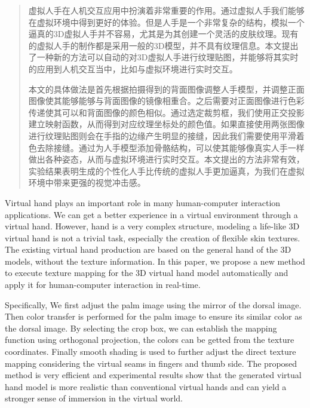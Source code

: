 \begin{abstract}
虚拟人手在人机交互应用中扮演着非常重要的作用。通过虚拟人手我们能够在虚拟环境中得到更好的体验。但是人手是一个非常复杂的结构，模拟一个逼真的3D虚拟人手并不容易，尤其是为其创建一个灵活的皮肤纹理。现有的虚拟人手的制作都是采用一般的3D模型，并不具有纹理信息。本文提出了一种新的方法可以自动的对3D虚拟人手进行纹理贴图，并能够将其实时的应用到人机交互当中，比如与虚拟环境进行实时交互。

本文的具体做法是首先根据拍摄得到的背面图像调整人手模型，并调整正面图像使其能够能够与背面图像的镜像相重合。之后需要对正面图像进行色彩传递使其可以和背面图像的颜色相似。通过选定裁剪框，我们使用正交投影建立映射函数，从而得到对应纹理坐标处的颜色值。如果直接使用两张图像进行纹理贴图则会在手指的边缘产生明显的接缝，因此我们需要使用平滑着色去除接缝。通过为人手模型添加骨骼结构，可以使其能够像真实人手一样做出各种姿态，从而与虚拟环境进行实时交互。本文提出的方法非常有效，实验结果表明生成的个性化人手比传统的虚拟人手更加逼真，为我们在虚拟环境中带来更强的视觉冲击感。

\end{abstract}

\begin{englishabstract}
Virtual hand plays an important role in many human-computer interaction
applications. We can get a better experience in a virtual environment
through a virtual hand. However, hand is a very complex structure, modeling
a life-like 3D virtual hand is not a trivial task, especially the creation
of flexible skin textures. The existing virtual hand production are based on the
general hand of the 3D models, without the texture information. In this paper, we propose a new method to execute texture mapping for the 3D
virtual hand model automatically and apply it for human-computer
interaction in real-time. 

Specifically, We first adjust the palm image
using the mirror of the dorsal image. Then color transfer is performed for
the palm image to ensure its similar color as the dorsal image. By
selecting the crop box, we can establish the mapping function using orthogonal
projection, the colors can be getted from the texture coordinates. Finally
smooth shading is used to further adjust the direct texture mapping considering the virtual seams in fingers and thumb side. The proposed method is very efficient  and experimental results show that the generated virtual hand model is more realistic than conventional virtual hands and can yield a stronger sense of immersion in the virtual world.

\end{englishabstract}
